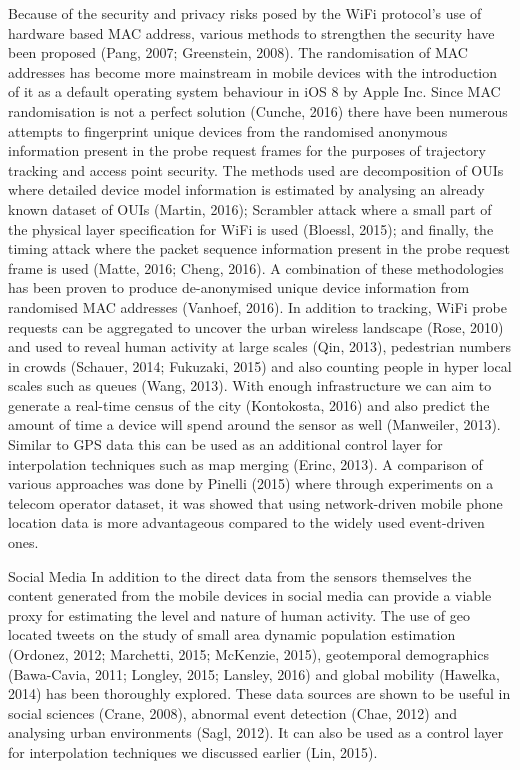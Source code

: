 Because of the security and privacy risks posed by the WiFi protocol’s use of
hardware based MAC address, various methods to strengthen the security have been
proposed (Pang, 2007; Greenstein, 2008). The randomisation of MAC addresses has
become more mainstream in mobile devices with the introduction of it as a
default operating system behaviour in iOS 8 by Apple Inc. Since MAC
randomisation is not a perfect solution (Cunche, 2016) there have been numerous
attempts to fingerprint unique devices from the randomised anonymous information
present in the probe request frames for the purposes of trajectory tracking and
access point security. The methods used are decomposition of OUIs where detailed
device model information is estimated by analysing an already known dataset of
OUIs (Martin, 2016); Scrambler attack where a small part of the physical layer
specification for WiFi is used (Bloessl, 2015); and finally, the timing attack
where the packet sequence information present in the probe request frame is used
(Matte, 2016; Cheng, 2016). A combination of these methodologies has been proven
to produce de-anonymised unique device information from randomised MAC addresses
(Vanhoef, 2016). In addition to tracking, WiFi probe requests can be aggregated
to uncover the urban wireless landscape (Rose, 2010) and used to reveal human
activity at large scales (Qin, 2013), pedestrian numbers in crowds (Schauer,
2014; Fukuzaki, 2015) and also counting people in hyper local scales such as
queues (Wang, 2013). With enough infrastructure we can aim to generate a
real-time census of the city (Kontokosta, 2016) and also predict the amount of
time a device will spend around the sensor as well (Manweiler, 2013). Similar to
GPS data this can be used as an additional control layer for interpolation
techniques such as map merging (Erinc, 2013). A comparison of various approaches
was done by Pinelli (2015) where through experiments on a telecom operator
dataset, it was showed that using network-driven mobile phone location data is
more advantageous compared to the widely used event-driven ones.


Social Media In addition to the direct data from the sensors themselves the
content generated from the mobile devices in social media can provide a viable
proxy for estimating the level and nature of human activity. The use of geo
located tweets on the study of small area dynamic population estimation
(Ordonez, 2012; Marchetti, 2015; McKenzie, 2015), geotemporal demographics
(Bawa-Cavia, 2011; Longley, 2015; Lansley, 2016) and global mobility (Hawelka,
2014) has been thoroughly explored. These data sources are shown to be useful in
social sciences (Crane, 2008), abnormal event detection (Chae, 2012) and
analysing urban environments (Sagl, 2012). It can also be used as a control
layer for interpolation techniques we discussed earlier (Lin, 2015).

